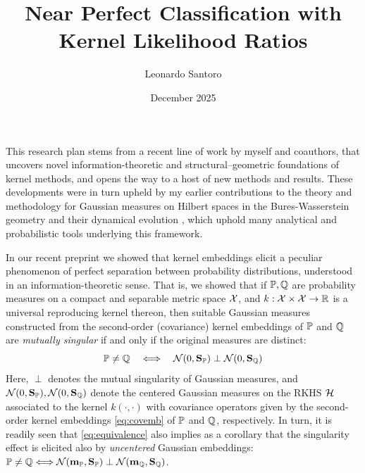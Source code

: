 \documentclass{article}
\title{Near Perfect Classification with Kernel Likelihood Ratios}
\author{Leonardo Santoro}
\date{December 2025}
\begin{document}
\maketitle


This research plan stems from a recent line of work \cite{santoro2025from,santoroLRT25} by myself and coauthors, that uncovers novel information-theoretic and structural–geometric foundations of kernel methods, and opens the way to a host of new methods and results. These developments were in turn upheld by my earlier contributions to the theory and methodology for Gaussian measures on Hilbert spaces in the Bures-Wasserstein geometry  \cite{santoro2023large, jaffe2024large} and their dynamical evolution \cite{santoro2023statistical,santoro2024karhunen}, which uphold many analytical and probabilistic tools underlying this framework.


 In our recent preprint \cite{santoro2025from}  we showed that kernel embeddings elicit a peculiar phenomenon of perfect separation between probability distributions, understood in an information-theoretic sense.
 That is, we showed that if $\mathbb{P},\mathbb{Q}$ are probability measures on a compact and separable metric space $\mathcal{X}$, and $k: \mathcal{X} \times \mathcal{X} \to \mathbb{R}$ is a universal reproducing kernel thereon, then suitable Gaussian measures constructed from the second-order (covariance) kernel embeddings of $\mathbb{P}$ and $\mathbb{Q}$ are \emph{mutually singular} if and only if the original measures are distinct:
 \begin{equation}
  \label{eq:equivalence}
\mathbb{P} \neq \mathbb{Q} 
\quad\Longleftrightarrow \quad
\mathcal{N}(0, \mathbf{S}_{\mathbb{P}}) \perp \mathcal{N}(0,\mathbf{S}_{\mathbb{Q}})
\end{equation}
Here, $\perp$ denotes the {mutual singularity} of Gaussian measures, and $\mathcal{N}(0, \mathbf{S}_{\mathbb{P}}), \mathcal{N}(0,\mathbf{S}_{\mathbb{Q}})$ denote the centered Gaussian measures on the RKHS $\mathcal{H}$ associated to the kernel $k(\cdot,\cdot)$ with covariance operators given by the second-order kernel embeddings \eqref{eq:covemb} of $\mathbb{P}$ and $\mathbb{Q}$, respectively. In turn, it is readily seen that \eqref{eq:equivalence} also implies as a corollary that the singularity effect is elicited also by \emph{uncentered} Gaussian embeddings: $\mathbb{P} \neq \mathbb{Q} 
\Longleftrightarrow \mathcal{N}(\mathbf{m}_{\mathbb{P}}, \mathbf{S}_{\mathbb{P}}) \perp \mathcal{N}(\mathbf{m}_{\mathbb{Q}},\mathbf{S}_{\mathbb{Q}})$.
\end{document}

